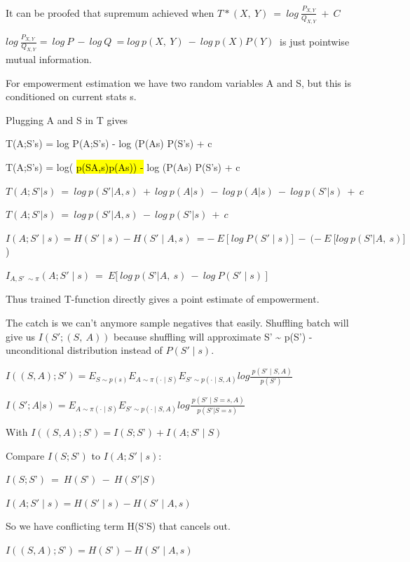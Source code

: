 It can be proofed that supremum achieved when $T*(X,\ Y)\  = \ log\ \frac{P_{X,Y}}{Q_{X,Y}}\  + \ C\ $

$log\ \frac{P_{X,Y}\ }{Q_{X,Y}} = \ log\ P\  - \ log\ Q\  = log\ p(X,\ Y)\  - \ log\ p(X)P(Y)\ $ is just pointwise mutual information.

For empowerment estimation we have two random variables A and S, but this is conditioned on current stats s.

Plugging A and S in T gives

T(A;S'\textbar s) = log P(A;S'\textbar s) - log (P(A\textbar s) P(S'\textbar s) + c

T(A;S'\textbar s) = log( \hl{p(S\textquotesingle\textbar A,s)p(A\textbar s)) -} log (P(A\textbar s) P(S'\textbar s) + c

$T(A;S’|s)\  = \ log\ p(S'|A,s)\  + \ log\ p(A|s)\  - \ log\ p(A|s)\  - \ log\ p(S’|s)\  + \ c$

$T(A;S’|s)\  = \ log\ p(S'|A,s)\  - \ log\ p(S’|s)\  + \ c$

$I(A;S' \mid s) = H(S' \mid s) - H(S' \mid A,s)\  = - \ E\ \lbrack\ log\ P(S' \mid s)\rbrack\  - \ ( - \ E\ \lbrack log\ p(S’|A,\ s)\rbrack$)

$I_{A,S'\ \sim\pi}(A;S' \mid s)\  = \ E\lbrack\ log\ p(S’|A,\ s)\  - \ log\ P(S' \mid s)\ \rbrack$

Thus trained T-function directly gives a point estimate of empowerment.

The catch is we can't anymore sample negatives that easily. Shuffling batch will give us $I(S';(S,\ A))$ because shuffling will approximate S' \textasciitilde{} p(S') - unconditional distribution instead of $P(S' \mid s)$.

$I((S,A);S') = E_{S \sim p(s)}E_{A \sim \pi( \cdot \mid S)}E_{S' \sim p( \cdot \mid S,A)} log\frac{\ p(S' \mid S,A)}{p(S')}$

$I(S';A|s) = E_{A \sim \pi( \cdot \mid S)}E_{S' \sim p( \cdot \mid S,A)} log\frac{\ p(S' \mid S = s,A)}{p(S'|S = s)}$

With $I((S,A);S’) = I(S;S’) + I(A;S’ \mid S)$ \hl{\hfill\break
}

Compare $I(S;S’)$ \hl{}to $I(A;S' \mid s)$:

$I(S;S’)\  = \ H(S’)\  - \ H(S'|S)$

$I(A;S' \mid s) = H(S' \mid s) - H(S' \mid A,s)$

So we have conflicting term H(S'\textbar S) that cancels out.

$I((S,A);S’) = H(S’) - H(S' \mid A,s)$

